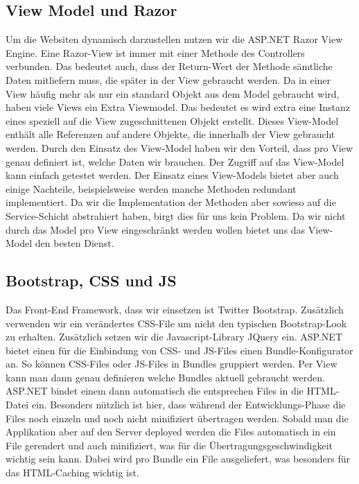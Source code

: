 	\subsection{View Model und Razor}
	Um die Websiten dynamisch darzustellen nutzen wir die ASP.NET Razor View Engine. Eine Razor-View ist immer mit einer Methode des Controllers verbunden. Das bedeutet auch, dass der Return-Wert der Methode sämtliche Daten mitliefern muss, die später in der View gebraucht werden. Da in einer View häufig mehr als nur ein standard Objekt aus dem Model gebraucht wird, haben viele Views ein Extra Viewmodel. Das bedeutet es wird extra eine Instanz eines speziell auf die View zugeschnittenen Objekt erstellt. Dieses View-Model enthält alle Referenzen auf andere Objekte, die innerhalb der View gebraucht werden.
	Durch den Einsatz des View-Model haben wir den Vorteil, dass pro View genau definiert ist, welche Daten wir brauchen. Der Zugriff auf das View-Model kann einfach getestet werden.
	Der Einsatz eines View-Models bietet aber auch einige Nachteile, beispielsweise werden manche Methoden redundant implementiert. Da wir die Implementation der Methoden aber sowieso auf die Service-Schicht abstrahiert haben, birgt dies für uns kein Problem.
	Da wir nicht durch das Model pro View eingeschränkt werden wollen bietet uns das View-Model den besten Dienst.

	\subsection{Bootstrap, CSS und JS}
	Das Front-End Framework, dass wir einsetzen ist Twitter Bootstrap. Zusätzlich verwenden wir ein verändertes CSS-File um nicht den typischen Bootstrap-Look zu erhalten.
	Zusätzlich setzen wir die Javascript-Library JQuery ein.
	ASP.NET bietet einen für die Einbindung von CSS- und JS-Files einen Bundle-Konfigurator an. So können CSS-Files oder JS-Files in Bundles gruppiert werden. Per View kann man dann genau definieren welche Bundles aktuell gebraucht werden. ASP.NET bindet einem dann automatisch die entsprechen Files in die HTML-Datei ein.
	Besonders nützlich ist hier, dass während der Entwicklungs-Phase die Files noch einzeln und noch nicht minifiziert übertragen werden. Sobald man die Applikation aber auf den Server deployed werden die Files automatisch in ein File gerendert und auch minifiziert, was für die Übertragungsgeschwindigkeit wichtig sein kann.
	Dabei wird pro Bundle ein File ausgeliefert, was besonders für das HTML-Caching wichtig ist.

